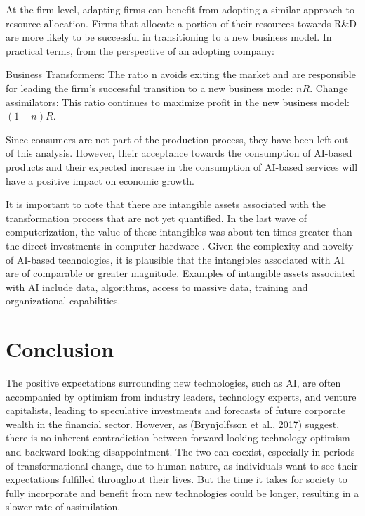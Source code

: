 \documentclass[preprint, 1p,
authoryear]{elsarticle} %
\begin{document}
At the firm level, adapting firms can benefit from adopting a similar
approach to resource allocation. Firms that allocate a portion of their
resources towards R\&D are more likely to be successful in transitioning
to a new business model. In practical terms, from the perspective of an
adopting company:

Business Transformers: The ratio n avoids exiting the market and are
responsible for leading the firm's successful transition to a new
business mode: \(nR\). Change assimilators: This ratio continues to
maximize profit in the new business model: \((1-n)R\).

Since consumers are not part of the production process, they have been
left out of this analysis. However, their acceptance towards the
consumption of AI-based products and their expected increase in the
consumption of AI-based services will have a positive impact on economic
growth.

It is important to note that there are intangible assets associated with
the transformation process that are not yet quantified. In the last wave
of computerization, the value of these intangibles was about ten times
greater than the direct investments in computer hardware
\citep{paradox}. Given the complexity and novelty of AI-based
technologies, it is plausible that the intangibles associated with AI
are of comparable or greater magnitude. Examples of intangible assets
associated with AI include data, algorithms, access to massive data,
training and organizational capabilities.

\hypertarget{conclusion}{%
\section{Conclusion}\label{conclusion}}

The positive expectations surrounding new technologies, such as AI, are
often accompanied by optimism from industry leaders, technology experts,
and venture capitalists, leading to speculative investments and
forecasts of future corporate wealth in the financial sector. However,
as (Brynjolfsson et al., 2017) suggest, there is no inherent
contradiction between forward-looking technology optimism and
backward-looking disappointment. The two can coexist, especially in
periods of transformational change, due to human nature, as individuals
want to see their expectations fulfilled throughout their lives. But the
time it takes for society to fully incorporate and benefit from new
technologies could be longer, resulting in a slower rate of
assimilation.
\end{document}
